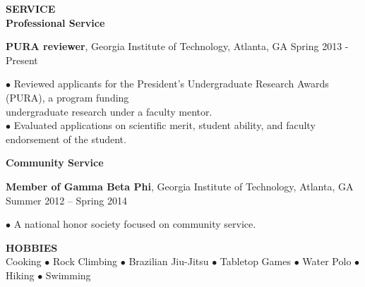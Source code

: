 \documentclass[10pt]{article}
\newenvironment{changemargin}[2]{%
  \list{}{\rightmargin#2\leftmargin#1
    \parsep=0pt\topsep=1pt\partopsep=0pt}
\item[]} {\endlist}
\newenvironment{indentmore}{\begin{changemargin}{10pt}{0cm}}{\end{changemargin}}
\begin{document}
\textbf{\large SERVICE}\\
{\bf Professional Service}
\begin{indentmore}
{\bf PURA reviewer}, Georgia Institute of Technology, Atlanta, GA \hfill Spring 2013 - Present
\begin{indentmore}
$\bullet$ Reviewed applicants for the President's Undergraduate Research Awards (PURA), a program funding \\ \hspace*{5pt} undergraduate research under a faculty mentor.\\
$\bullet$ Evaluated applications on scientific merit, student ability, and faculty endorsement of the student.\\
\end{indentmore}
\end{indentmore}


{\bf Community Service}
\begin{indentmore}
{\bf Member of Gamma Beta Phi}, Georgia Institute of Technology, Atlanta, GA \hfill Summer 2012 -- Spring 2014
\begin{indentmore}
$\bullet$ A national honor society focused on community service. \\
\end{indentmore}
\end{indentmore}

\textbf{\large HOBBIES} \\
 Cooking $\bullet$ Rock Climbing $\bullet$ Brazilian Jiu-Jitsu $\bullet$  Tabletop Games $\bullet$ Water Polo $\bullet$ Hiking $\bullet$ Swimming
\end{document}
